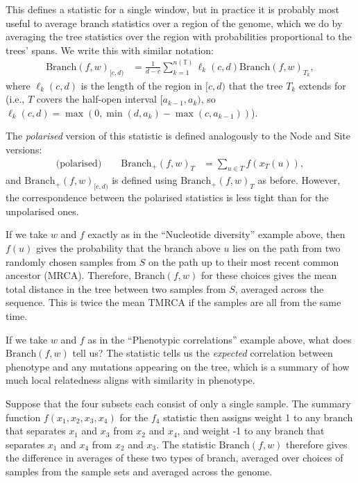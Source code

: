 \documentclass{article}
\newcommand{\branch}{\mbox{Branch}} %
\newcommand{\branchp}{\mbox{Branch}_+} %
\newcommand{\treeseq}{\mathbb{T}} %
\newcommand{\iw}{w} %
\newcommand{\nw}{x} %
\begin{document}
This defines a statistic for a single window,
but in practice it is probably most useful to average branch statistics
over a region of the genome,
which we do by averaging the tree statistics over the region
with probabilities proportional to the trees' spans.
We write this with similar notation:
\begin{align}
    \branch(f, \iw)_{[c,d)}
    &=
    \frac{1}{d-c} \sum_{k=1}^{n(\treeseq)} \ell_k(c,d) \branch(f, \iw)_{T_k} ,
\end{align}
where $\ell_k(c,d)$ is the length of the region in $[c,d)$ that the tree $T_k$ extends for
(i.e., $T$ covers the half-open interval $[a_{k-1},a_k)$,
so $\ell_k(c,d) = \max(0, \min(d,a_k) - \max(c,a_{k-1}))$).

The \emph{polarised} version of this statistic
is defined analogously to the Node and Site versions:
\begin{align} \label{eqn:branch_polarised}
    \text{(polarised)} \qquad
    \branchp(f, \iw)_T
    &=
    \sum_{u \in T} f(\nw_{T}(u)) ,
\end{align}
and $\branchp(f, \iw)_{[c,d)}$ is defined using $\branchp(f, \iw)_T$ as before.
However, the correspondence between the polarised statistics is less tight
than for the unpolarised ones.


\begin{example} \label{ex:branch_diversity}
    If we take $\iw$ and $f$ exactly as in the ``Nucleotide diversity'' example above,
    then $f(u)$ gives the probability that the branch above $u$
    lies on the path from two randomly chosen samples from $S$
    on the path up to their most recent common ancestor (MRCA).
    Therefore, $\branch(f, \iw)$ for these choices
    gives the mean total distance in the tree between two samples from $S$,
    averaged across the sequence.
    This is twice the mean TMRCA if the samples are all from the same time.
\end{example}

\begin{example} \label{ex:branch_correlation}
    If we take $\iw$ and $f$ as in the ``Phenotypic correlations'' example above,
    what does $\branch(f, \iw)$ tell us?
    The statistic tells us the \emph{expected} correlation between phenotype and any mutations
    appearing on the tree, which is a summary of how much local relatedness
    aligns with similarity in phenotype.
\end{example}


\begin{example}[Patterson's $f_4$] \label{ex:branch_f4}
    Suppose that the four subsets each consist of only a single sample.
    The summary function $f(x_1, x_2, x_3, x_4)$ for the $f_4$ statistic
    then assigns weight 1 to any branch that separates $x_1$ and $x_3$ from $x_2$ and $x_4$,
    and weight -1 to any branch that separates $x_1$ and $x_4$ from $x_2$ and $x_3$.
    The statistic $\branch(f, \iw)$ therefore
    gives the difference in averages of these two types of branch,
    averaged over choices of samples from the sample sets and averaged across the genome.
\end{example}
\end{document}
